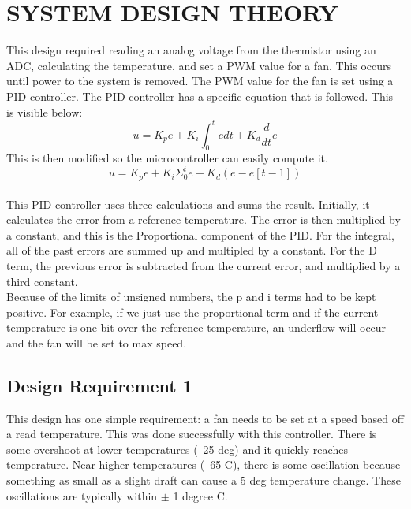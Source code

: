 \documentclass{hitec}
\begin{document}
\section{SYSTEM DESIGN THEORY}
This design required reading an analog voltage from the thermistor using an ADC, calculating the temperature, and set a PWM value for a fan. This occurs until power to the system is removed. The PWM value for the fan is set using a PID controller. The PID controller has a specific equation that is followed. This is visible below:
\begin{equation}
u = K_p e + K_i \int_0^t e dt + K_d \frac{d}{dt} e
\end{equation}
This is then modified so the microcontroller can easily compute it.\\
\begin{equation}
u = K_p e + K_i \Sigma_0^t  e + K_d( e - e[t-1])
\end{equation}
\\
This PID controller uses three calculations and sums the result. Initially, it calculates the error from a reference temperature. The error is then multiplied by a constant, and this is the Proportional component of the PID. For the integral, all of the past errors are summed up and multipled by a constant. For the D term, the previous error is subtracted from the current error, and multiplied by a third constant.
\\
Because of the limits of unsigned numbers, the p and i terms had to be kept positive. For example, if we just use the proportional term and if the current temperature is one bit over the reference temperature, an underflow will occur and the fan will be set to max speed.

\subsection{Design Requirement 1}

This design has one simple requirement: a fan needs to be set at a speed based off a read temperature. This was done successfully with this controller. There is some overshoot at lower temperatures (~25 deg) and it quickly reaches temperature. Near higher temperatures (~65 C), there is some oscillation because something as small as a slight draft can cause a 5 deg temperature change. These oscillations are typically within $\pm$ 1 degree C. 
\end{document}
